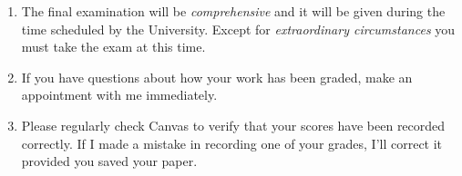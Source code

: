 \documentclass[12pt]{article}
\newcounter{ex}\setcounter{ex}{0}
\begin{document}
\begin{enumerate}
\item The final examination will be \emph{comprehensive} and it will be given 
during the  time scheduled by the University. Except for \emph{extraordinary circumstances}
you must take the exam at this time.
 
\item If you have questions about how your work has been graded, make an appointment with me immediately.



\item Please regularly check Canvas  to verify that your scores have 
been recorded correctly.  If I made a mistake in recording one of
your grades, I'll correct it provided you saved your paper.



\end{enumerate}
\end{document}
